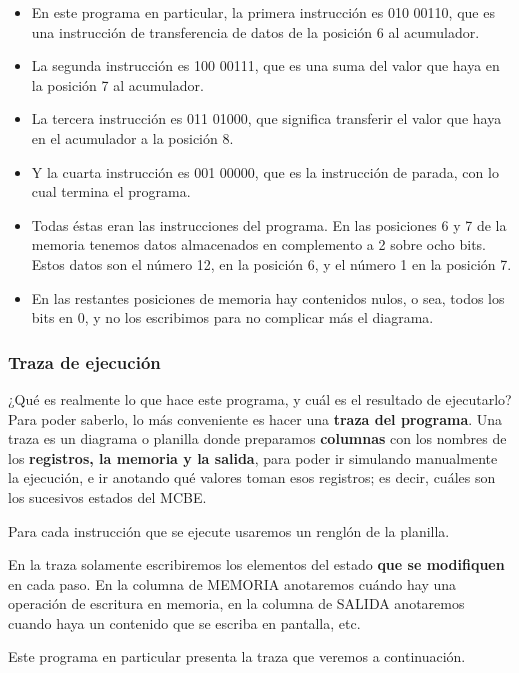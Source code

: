 \documentclass[spanish,A4,]{article}
\begin{document}
\begin{itemize}
\itemsep1pt\parskip0pt
\item
  En este programa en particular, la primera instrucción es 010 00110,
  que es una instrucción de transferencia de datos de la posición 6 al
  acumulador.
\item
  La segunda instrucción es 100 00111, que es una suma del valor que
  haya en la posición 7 al acumulador.
\item
  La tercera instrucción es 011 01000, que significa transferir el valor
  que haya en el acumulador a la posición 8.
\item
  Y la cuarta instrucción es 001 00000, que es la instrucción de parada,
  con lo cual termina el programa.
\item
  Todas éstas eran las instrucciones del programa. En las posiciones 6 y
  7 de la memoria tenemos datos almacenados en complemento a 2 sobre
  ocho bits. Estos datos son el número 12, en la posición 6, y el número
  1 en la posición 7.
\item
  En las restantes posiciones de memoria hay contenidos nulos, o sea,
  todos los bits en 0, y no los escribimos para no complicar más el
  diagrama.
\end{itemize}

\subsubsection{Traza de ejecución}\label{traza-de-ejecuciuxf3n}

¿Qué es realmente lo que hace este programa, y cuál es el resultado de
ejecutarlo? Para poder saberlo, lo más conveniente es hacer una
\textbf{traza del programa}. Una traza es un diagrama o planilla donde
preparamos \textbf{columnas} con los nombres de los \textbf{registros,
la memoria y la salida}, para poder ir simulando manualmente la
ejecución, e ir anotando qué valores toman esos registros; es decir,
cuáles son los sucesivos estados del MCBE.

Para cada instrucción que se ejecute usaremos un renglón de la planilla.

En la traza solamente escribiremos los elementos del estado \textbf{que
se modifiquen} en cada paso. En la columna de MEMORIA anotaremos cuándo
hay una operación de escritura en memoria, en la columna de SALIDA
anotaremos cuando haya un contenido que se escriba en pantalla, etc.

Este programa en particular presenta la traza que veremos a
continuación.
\end{document}
